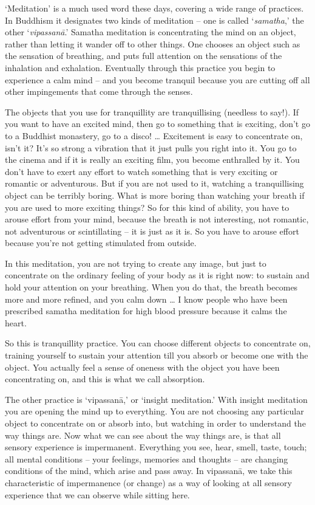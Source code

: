 
`Meditation' is a much used word these days, covering a wide range of practices. In Buddhism it designates two kinds of meditation -- one is called `\textit{samatha},' the other `\textit{vipassanā}.' Samatha meditation is concentrating the mind on an object, rather than letting it wander off to other things. One chooses an object such as the sensation of breathing, and puts full attention on the sensations of the inhalation and exhalation. Eventually through this practice you begin to experience a calm mind -- and you become tranquil because you are cutting off all other impingements that come through the senses.

The objects that you use for tranquillity are tranquillising (needless to say!). If you want to have an excited mind, then go to something that is exciting, don't go to a Buddhist monastery, go to a disco! \ldots{} Excitement is easy to concentrate on, isn't it? It's so strong a vibration that it just pulls you right into it. You go to the cinema and if it is really an exciting film, you become enthralled by it. You don't have to exert any effort to watch something that is very exciting or romantic or adventurous. But if you are not used to it, watching a tranquillising object can be terribly boring. What is more boring than watching your breath if you are used to more exciting things? So for this kind of ability, you have to arouse effort from your mind, because the breath is not interesting, not romantic, not adventurous or scintillating -- it is just as it is. So you have to arouse effort because you're not getting stimulated from outside.

In this meditation, you are not trying to create any image, but just to concentrate on the ordinary feeling of your body as it is right now: to sustain and hold your attention on your breathing. When you do that, the breath becomes more and more refined, and you calm down \ldots{} I know people who have been prescribed samatha meditation for high blood pressure because it calms the heart.

So this is tranquillity practice. You can choose different objects to concentrate on, training yourself to sustain your attention till you absorb or become one with the object. You actually feel a sense of oneness with the object you have been concentrating on, and this is what we call absorption.

The other practice is `vipassanā,' or `insight meditation.' With insight meditation you are opening the mind up to everything. You are not choosing any particular object to concentrate on or absorb into, but watching in order to understand the way things are. Now what we can see about the way things are, is that all sensory experience is impermanent. Everything you see, hear, smell, taste, touch; all mental conditions -- your feelings, memories and thoughts -- are changing conditions of the mind, which arise and pass away. In vipassanā, we take this characteristic of impermanence (or change) as a way of looking at all sensory experience that we can observe while sitting here.

